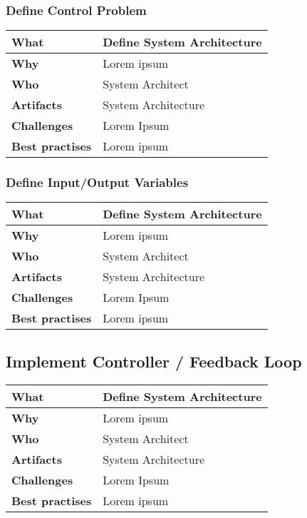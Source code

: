 \subsubsection{Define Control Problem}
 \label{table:ch6_Task_Define_System_Architect}
\begin{tabular}
	{|m{3cm}|m{10cm}|} \hline \bfseries What & Define System Architecture\\
	\hline \bfseries Why & Lorem ipsum\\
	\hline \bfseries Who & System Architect\\
	\hline \bfseries Artifacts & System Architecture\\
	\hline \bfseries Challenges & Lorem Ipsum\\
	\hline \bfseries Best practises & Lorem ipsum\\
	\hline 
\end{tabular}

\subsubsection{Define Input/Output Variables}
 \label{table:ch6_Task_Define_System_Architect}
\begin{tabular}
	{|m{3cm}|m{10cm}|} \hline \bfseries What & Define System Architecture\\
	\hline \bfseries Why & Lorem ipsum\\
	\hline \bfseries Who & System Architect\\
	\hline \bfseries Artifacts & System Architecture\\
	\hline \bfseries Challenges & Lorem Ipsum\\
	\hline \bfseries Best practises & Lorem ipsum\\
	\hline 
\end{tabular}

\subsection{Implement Controller / Feedback Loop}
 \label{table:ch6_Task_Define_System_Architect}
\begin{tabular}
	{|m{3cm}|m{10cm}|} \hline \bfseries What & Define System Architecture\\
	\hline \bfseries Why & Lorem ipsum\\
	\hline \bfseries Who & System Architect\\
	\hline \bfseries Artifacts & System Architecture\\
	\hline \bfseries Challenges & Lorem Ipsum\\
	\hline \bfseries Best practises & Lorem ipsum\\
	\hline 
\end{tabular}

